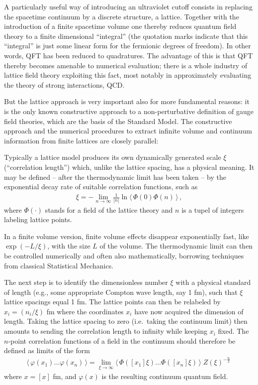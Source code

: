 \documentclass[multphys,vecphys]{svmult}
\newcommand{\bea}{\begin{eqnarray}}
\newcommand{\eea}{\end{eqnarray}}
\begin{document}
A particularly useful way of introducing an
ultraviolet cutoff consists in
replacing the spacetime continuum by a discrete structure, a
lattice. Together with the introduction
of a finite spacetime volume one thereby reduces quantum field theory
to a finite dimensional ``integral'' (the quotation marks indicate
that this ``integral'' is just some linear form for the fermionic
degrees of freedom). In other words, QFT has been reduced to
quadratures. The advantage of this is that QFT thereby becomes  
amenable to numerical evaluation; there is a whole industry of lattice 
field theory exploiting this fact, most notably in approximately 
evaluating the theory of strong
interactions, QCD.  

But the lattice approach is very
important also for more fundamental reasons: it is the only known
constructive approach to a
non-perturbative definition of gauge
field theories, which are the basis of the Standard Model. The
constructive approach and the numerical procedures to extract infinite
volume and continuum information from finite lattices are closely parallel:

Typically a lattice model produces its
own dynamically generated scale $\xi$ (``correlation length'') which,
unlike the lattice spacing, has a physical meaning. It may be defined
-- after the thermodynamic limit has been taken -- by the exponential
decay rate of suitable correlation functions, such as 
\bea
\label{defxi}
  \xi=-\lim_{n\to\infty} \frac{1}{|n|}\ln \langle\, \Phi(0)\Phi(n)\,\rangle\, ,
\eea
where $\Phi(\cdot)$ stands for a field of the lattice theory
and $n$ is a tupel of integers labeling lattice points.

In a finite volume version, finite volume effects disappear exponentially
fast, like $\exp(-L/\xi)$, with the size $L$ of the volume. The
thermodynamic limit can then be controlled numerically and often also
mathematically, borrowing techniques from classical Statistical Mechanics.

The next step is to identify the dimensionless number $\xi$ with a
physical standard of length (e.g., some appropriate Compton wave
length, say 1 fm), such that $\xi$ lattice spacings equal 1 fm. The lattice points can then be
relabeled by $x_i=(n_i/\xi)$ fm where the coordinates $x_i$ have now
acquired the dimension of length. Taking the lattice spacing to zero
(i.e.\ taking the continuum limit) then amounts to sending the
correlation length to infinity while keeping $x_i$ fixed. 
The $n$-point correlation functions of a field in the continuum 
should therefore be defined as limits of the form
\bea 
  \langle\, \varphi(x_1)\ldots \varphi(x_n)\,\rangle = 
  \lim_{\xi\to\infty} \langle\, \Phi([x_1]\xi) \ldots \Phi([x_n]\xi)\,\rangle 
  \;Z(\xi)^{-\frac{n}{2}}\ 
\eea
where $x=[x]$ fm, and $\varphi(x)$ is the resulting continuum quantum field. 
\end{document}
